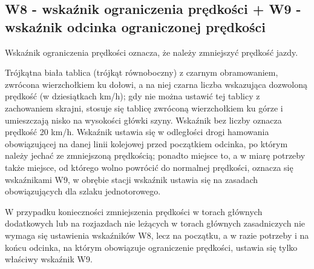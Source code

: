 \subsection{W8 - wskaźnik ograniczenia prędkości + W9 - wskaźnik odcinka ograniczonej prędkości}
\begin{tcolorbox}[colback=black!5!white,colframe=white!55!black,title=Wskaźnik W8]
{\textquotedbl}Wskaźnik ograniczenia prędkości{\textquotedbl} oznacza, że należy zmniejszyć prędkość jazdy. 
\end{tcolorbox}Trójkątna biała tablica (trójkąt równoboczny) z czarnym obramowaniem, zwrócona wierzchołkiem ku dołowi, a na niej czarna liczba wskazująca dozwoloną prędkość (w dziesiątkach km/h); gdy nie można ustawić tej tablicy z zachowaniem skrajni, stosuje się tablicę zwróconą wierzchołkiem ku górze i umieszczają nisko na wysokości główki szyny. Wskaźnik bez liczby oznacza prędkość 20 km/h. Wskaźnik ustawia się w odległości drogi hamowania obowiązującej na danej linii kolejowej przed początkiem odcinka, po którym należy jechać ze zmniejszoną prędkością; ponadto miejsce to, a w miarę potrzeby także miejsce, od którego wolno powrócić do normalnej prędkości, oznacza się wskaźnikami W9, w obrębie stacji wskaźnik ustawia się na zasadach obowiązujących dla szlaku jednotorowego. 

W przypadku konieczności zmniejszenia prędkości w torach głównych dodatkowych lub na rozjazdach nie leżących w torach głównych zasadniczych nie wymaga się ustawienia wskaźników W8, lecz na początku, a w razie potrzeby i na końcu odcinka, na którym obowiązuje ograniczenie prędkości, ustawia się tylko właściwy wskaźnik W9.

